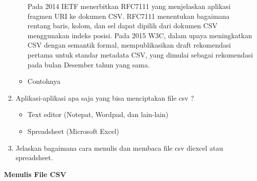 \begin{enumerate}
\begin{itemize}
     Pada 2014 IETF menerbitkan RFC7111 yang menjelaskan aplikasi fragmen URI ke dokumen CSV. RFC7111 menentukan bagaimana rentang baris, kolom, dan sel dapat dipilih dari dokumen CSV menggunakan indeks posisi. Pada 2015 W3C, dalam upaya meningkatkan CSV dengan semantik formal, mempublikasikan draft rekomendasi pertama untuk standar metadata CSV, yang dimulai sebagai rekomendasi pada bulan Desember tahun yang sama.

     \item Contohnya
       
     \end{itemize}

 \item Aplikasi-aplikasi apa saja yang bisa menciptakan file csv ?
       \begin{itemize}
         \item Text editor (Notepat, Wordpad, dan lain-lain)
         \item Spreadsheet (Microsoft Excel)
       \end{itemize}
 \item Jelaskan bagaimana cara menulis dan membaca file csv diexcel atau spreadsheet.
\end{enumerate}
    \textbf{Menulis File CSV}
